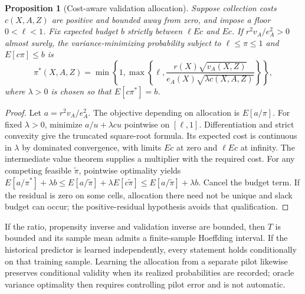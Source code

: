 \documentclass[11pt]{article}
\newtheorem{proposition}[theorem]{Proposition}
\theoremstyle{remark}
\begin{document}
\begin{proposition}[Cost-aware validation allocation]
Suppose collection costs $c(X,A,Z)$ are positive and bounded away from zero, and impose a floor $0<\ell<1$. Fix expected budget $b$ strictly between $\ell Ec$ and $Ec$. If $r^2v_A/e_A^2>0$ almost surely, the variance-minimizing probability subject to $\ell\le\pi\le1$ and $E[c\pi]\le b$ is
\[
 \pi^*(X,A,Z)=\min\left\{1,\max\left\{\ell,
 \frac{r(X)\sqrt{v_A(X,Z)}}{e_A(X)\sqrt{\lambda c(X,A,Z)}}\right\}\right\},
\]
where $\lambda>0$ is chosen so that $E[c\pi^*]=b$.
\end{proposition}
\begin{proof}
Let $a=r^2v_A/e_A^2$. The objective depending on allocation is $E[a/\pi]$. For fixed $\lambda>0$, minimize $a/u+\lambda cu$ pointwise on $[\ell,1]$. Differentiation and strict convexity give the truncated square-root formula. Its expected cost is continuous in $\lambda$ by dominated convergence, with limits $Ec$ at zero and $\ell Ec$ at infinity. The intermediate value theorem supplies a multiplier with the required cost. For any competing feasible $\widetilde\pi$, pointwise optimality yields
$E[a/\pi^*]+\lambda b\le E[a/\widetilde\pi]+\lambda E[c\widetilde\pi]\le E[a/\widetilde\pi]+\lambda b$.
Cancel the budget term. If the residual is zero on some cells, allocation there need not be unique and slack budget can occur; the positive-residual hypothesis avoids that qualification.
\end{proof}
If the ratio, propensity inverse and validation inverse are bounded, then $T$ is bounded and its sample mean admits a finite-sample Hoeffding interval. If the historical predictor is learned independently, every statement holds conditionally on that training sample. Learning the allocation from a separate pilot likewise preserves conditional validity when its realized probabilities are recorded; oracle variance optimality then requires controlling pilot error and is not automatic.
\end{document}
